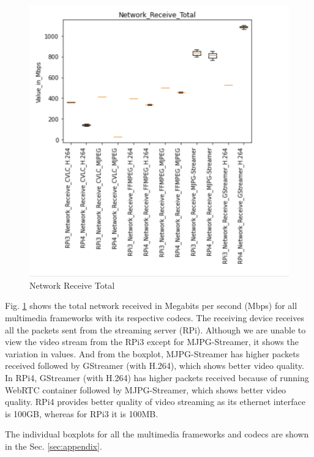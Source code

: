 \begin{figure}[H]
   \centering
   \includegraphics[width=.8\textwidth, trim=4 4 4 4,clip]{images/Boxplots/Network_Receive_Total.png}
   \caption{Network Receive Total}
   \label{fig:network_receive_total}
\end{figure}

Fig. \ref{fig:network_receive_total} shows the total network received in Megabits per second (Mbps) for all multimedia frameworks with its respective codecs. The receiving device receives all the packets sent from the streaming server (RPi).
Although we are unable to view the video stream from the RPi3 except for MJPG-Streamer, it shows the variation in values. And from the boxplot, MJPG-Streamer has higher packets received followed by GStreamer (with H.264), which shows better video quality. In RPi4, GStreamer (with H.264) has higher packets received because of running WebRTC container followed by MJPG-Streamer, which shows better video quality. RPi4 provides better quality of video streaming as its ethernet interface is 100GB, whereas for RPi3 it is 100MB.

The individual boxplots for all the multimedia frameworks and codecs are shown in the Sec. \ref{sec:appendix}.